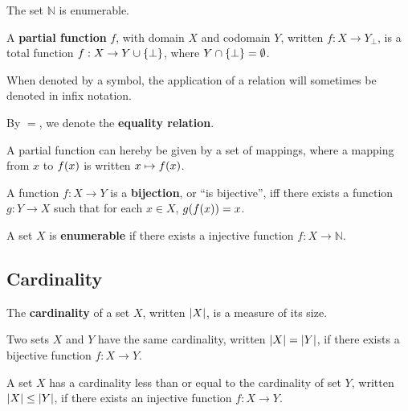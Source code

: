 \begin{corollary} The set $\mathbb{N}$ is enumerable. \end{corollary}

\begin{definition} A \textbf{partial function} $f$, with domain $X$ and
codomain $Y$, written $f:X\rightarrow Y_{\bot}$, is a total function
$f:X\rightarrow Y \cup \mathopen{}\left\{{\bot}\right\}\mathclose{}$, where $Y\cap \mathopen{}\left\{{\bot}\right\}\mathclose{} = \emptyset$.
\end{definition}

\begin{notation} When denoted by a symbol, the application of a relation will
sometimes be denoted in infix notation. \end{notation}

\begin{notation} By $=$, we denote the \textbf{equality relation}.
\end{notation}

 A partial function can hereby be given by a set of mappings,
where a mapping from $x$ to $f\mathopen{}\left({x}\right)\mathclose{}$ is written $x\mapsto f\mathopen{}\left({x}\right)\mathclose{}$.

\begin{definition} A function $f:X\rightarrow Y$ is a \textbf{bijection}, or
``is bijective'', iff there exists a function $g:Y\rightarrow X$ such that for
each $x\in X$, $g\mathopen{}\left({f\mathopen{}\left({x}\right)\mathclose{}}\right)\mathclose{}=x$. \end{definition}

\begin{definition} A set $X$ is \textbf{enumerable} if there exists a injective
function $f:X\rightarrow \mathbb{N}$. \end{definition}

\subsection{Cardinality}

\begin{notion} The \textbf{cardinality} of a set $X$, written $\mathopen{}\left|{X}\right|\mathclose{}$, is a
measure of its size. \end{notion}

\begin{definition} Two sets $X$ and $Y$ have the same cardinality, written
$\mathopen{}\left|{X}\right|\mathclose{}=\mathopen{}\left|{Y}\right|\mathclose{}$, if there exists a bijective function $f:X\rightarrow
Y$.\end{definition}

\begin{definition} \label{def:card-leq} A set $X$ has a cardinality less than
or equal to the cardinality of set $Y$, written $\mathopen{}\left|{X}\right|\mathclose{}\leq\mathopen{}\left|{Y}\right|\mathclose{}$, if
there exists an injective function $f:X\rightarrow Y$. \end{definition}

